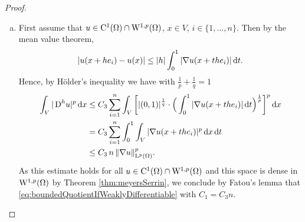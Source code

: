 \begin{proof}
  \begin{enumerate}[a)]
    \item First assume that $u \in \mathrm{C}^1(\Omega) \cap \mathrm{W}^{1,p}(\Omega)$, $x \in V$, $i \in \{1,\dots,n\}$.
      Then by the mean value theorem,
      $$
      |u(x + he_i) - u(x)| \leq |h| \int_0^1 |\nabla u(x + th e_i)| \, {\operatorname{d}\!{t}}.
      $$
      Hence, by Hölder's inequality we have with $\frac{1}{p} + \frac{1}{q} = 1$
      \begin{align*}
        \int_V |\,{\operatorname{D}}^h u|^p \, {\operatorname{d}\!{x}}
        &\leq C_3 \sum_{i = 1}^n \int_V \bigg[ |(0,1)|^{\frac{1}{q}} \cdot \Big( \int_0^1 |\nabla u(x + the_i)| \, {\operatorname{d}\!{t}} \Big)^{\frac{1}{p}} \bigg]^p \, {\operatorname{d}\!{x}} \\
        &= C_3 \sum_{i = 1}^n \int_0^1 \int_V |\nabla u(x + the_i)|^p \, {\operatorname{d}\!{x}} \, {\operatorname{d}\!{t}} \\
        &\leq C_3\, n\, \|\nabla u\|^p_{\mathrm{L}^p(\Omega)}.
      \end{align*}
      As this estimate holds for all $u \in \mathrm{C}^1(\Omega) \cap \mathrm{W}^{1,p}(\Omega)$ and this space is dense in $\mathrm{W}^{1,p}(\Omega)$ by Theorem \ref{thm:meyersSerrin}, we conclude by Fatou's lemma that \eqref{eq:boundedQuotientIfWeaklyDifferentiable} with $C_1 = C_3 n$.


\end{enumerate}
\end{proof}
